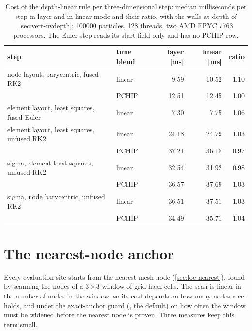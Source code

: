 \begin{table}[t]
\centering\footnotesize\setlength{\tabcolsep}{4pt}
\begin{tabular}{@{}llrrr@{}}
\toprule
step & time blend & layer [ms] & linear [ms] & ratio \\
\midrule
node layout, barycentric, fused RK2 & linear & 9.59 & 10.52 & 1.10 \\
 & PCHIP & 12.51 & 12.45 & 1.00 \\
element layout, least squares, fused Euler & linear & 7.30 & 7.75 & 1.06 \\
element layout, least squares, unfused RK2 & linear & 24.18 & 24.79 & 1.03 \\
 & PCHIP & 37.21 & 36.18 & 0.97 \\
sigma, element least squares, unfused RK2 & linear & 32.54 & 31.92 & 0.98 \\
 & PCHIP & 36.57 & 37.69 & 1.03 \\
sigma, node barycentric, unfused RK2 & linear & 36.51 & 37.51 & 1.03 \\
 & PCHIP & 34.49 & 35.71 & 1.04 \\
\bottomrule
\end{tabular}
\caption{Cost of the depth-linear rule per three-dimensional step: median milliseconds per step in layer
and in linear mode and their ratio, with the walls at depth of \cref{sec:vert-uvdepth}; \num{100000}
particles, 128 threads, two AMD EPYC 7763 processors. The Euler step reads its start field only and has no
PCHIP row.}
\label{tab:perf-depth-linear}
\end{table}


\section{The nearest-node anchor}\label{sec:perf-anchor}

Every evaluation site starts from the nearest mesh node (\cref{sec:loc-nearest}), found by scanning
the nodes of a $3\times3$ window of grid-hash cells. The scan is linear in the number of nodes in the
window, so its cost depends on how many nodes a cell holds, and under the exact-anchor guard
(, the default) on how often the window must be widened before the
nearest node is proven. Three measures keep this term small.

